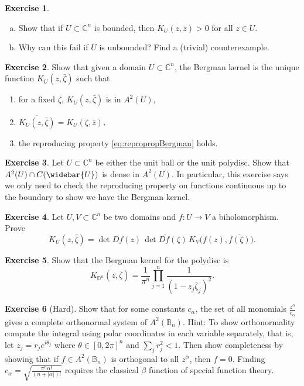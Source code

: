 \documentclass[12pt,openany]{book}
\newcommand{\abs}[1]{\left\lvert {#1} \right\rvert}
\newcommand{\C}{{\mathbb{C}}}
\newcommand{\D}{{\mathbb{D}}}
\newcommand{\bB}{{\mathbb{B}}}
\theoremstyle{plain}
\theoremstyle{remark}
\theoremstyle{definition}
\newenvironment{exbox}{%
    \def\FrameCommand{\vrule width 1pt \relax\hspace{10pt}}%
    \MakeFramed{\advance\hsize-\width\FrameRestore}%
}{%
    \endMakeFramed
}
\newenvironment{exparts}{%
    \leavevmode\begin{enumerate}[a),noitemsep,topsep=0pt,parsep=0pt,partopsep=0pt]
}{%
    \end{enumerate}
}
\newenvironment{exnumparts}{%
    \leavevmode\begin{enumerate}[1),noitemsep,topsep=0pt,parsep=0pt,partopsep=0pt]
}{%
    \end{enumerate}
}
\theoremstyle{exercise}
\newtheorem{exercise}{Exercise}[section]
\theoremstyle{example}
\begin{document}
\begin{exbox}
\begin{exercise}
\begin{exparts}
\item
Show that if $U \subset \C^n$ is bounded, then
$K_U(z,\bar{z}) > 0$
for all $z \in U$.
\item
Why can this fail if $U$ is unbounded?
Find a (trivial) counterexample.
\end{exparts}
\end{exercise}

\begin{exercise}
Show that given a domain $U \subset \C^n$, the Bergman kernel is the unique
function $K_U(z,\bar{\zeta})$ such that
\begin{exnumparts}
\item
for a fixed $\zeta$, $K_U(z,\bar{\zeta})$ is in $A^2(U)$,
\item
$\overline{K_U(z,\bar{\zeta})} =
K_U(\zeta,\bar{z})$,
\item
the reproducing property \eqref{eq:repropropBergman}
holds.
\end{exnumparts}
\end{exercise}

\begin{exercise}
Let $U \subset \C^n$ be either the unit ball or the unit polydisc.
Show that 
$A^2(U) \cap C(\widebar{U})$ is dense in $A^2(U)$.  In particular, this
exercise says we
only need to check the reproducing property on functions continuous up to
the boundary to show we have the Bergman kernel.
\end{exercise}

\begin{exercise}
Let $U, V \subset \C^n$ be two domains and $f \colon U \to V$ a
biholomorphism.  Prove
\begin{equation*}
K_U(z,\bar{\zeta}) = \det D f(z) \, \overline{\det D f (\zeta)} \,
K_V\bigl(f(z),\overline{f(\zeta)}\bigr) .
\end{equation*}
\end{exercise}

\begin{exercise}
Show that the Bergman kernel for the polydisc is
\begin{equation*}
K_{\D^n}(z,\bar{\zeta}) =
\frac{1}{\pi^n} \prod_{j=1}^n \frac{1}{{(1-z_j\bar{\zeta}_j)}^2}.
\end{equation*}
\end{exercise}

\begin{exercise}[Hard]
Show that for
some constants $c_\alpha$,
the set of all monomials $\frac{z^\alpha}{c_\alpha}$ gives a complete orthonormal
system of $A^2(\bB_n)$.  Hint: To show orthonormality
compute the integral using polar coordinates in each variable
separately, that is, let $z_j = r_j e^{i\theta_j}$ where $\theta \in
[0,2\pi]^n$ and $\sum_j r_j^2 < 1$.  Then show completeness by showing that
if $f \in A^2(\bB_n)$ is orthogonal to all $z^\alpha$, then $f = 0$.
Finding $c_\alpha = \sqrt{\frac{\pi^n \alpha!}{(n+\abs{\alpha})!}}$ requires
the classical $\beta$ function of special function theory.
\end{exercise}


\end{exbox}
\end{document}
